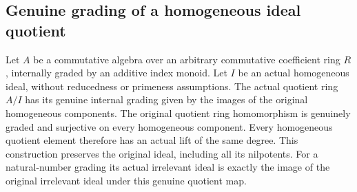 \subsection{Genuine grading of a homogeneous ideal quotient}
\label{subsec:homogeneous-quotient-grading}

\begin{theorem}
\label{graded:homogeneous-ideal-quotient-grading}
\leanok
Let $A$ be a commutative algebra over an arbitrary commutative coefficient
ring $R$, internally graded by an additive index monoid. Let $I$ be an
actual homogeneous ideal, without reducedness or primeness assumptions.
The actual quotient ring $A/I$ has its genuine internal grading given
by the images of the original homogeneous components. The original
quotient ring homomorphism is genuinely graded and surjective on every
homogeneous component. Every homogeneous quotient element therefore
has an actual lift of the same degree. This construction preserves the
original ideal, including all its nilpotents. For a natural-number
grading its actual irrelevant ideal is exactly the image of the original
irrelevant ideal under this genuine quotient map.
\end{theorem}
